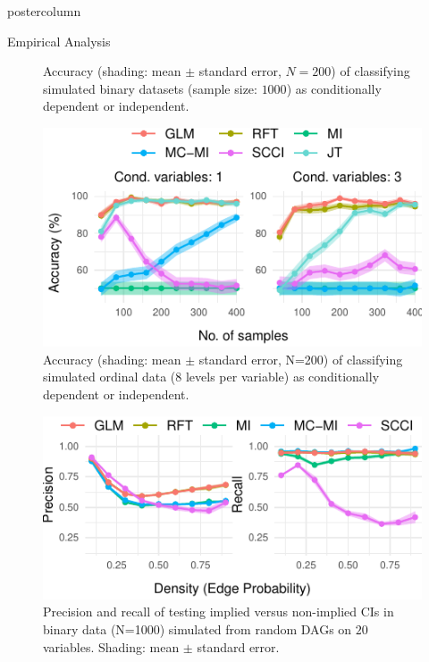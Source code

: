 \documentclass{beamer}
\begin{document}
\begin{frame}
\begin{columns}
\begin{column}{.33\textwidth}
\begin{beamercolorbox}[center]{postercolumn}
\begin{minipage}{.98\textwidth}
{\begin{myblock}{Empirical Analysis}
\begin{figure}
							\caption{Accuracy (shading: mean $\pm$ standard error, $N=200$) of classifying
							simulated binary datasets (sample size: $1000$) as conditionally
							dependent or independent.}
							\label{fig:cat_discrimination}
						\end{figure}
						\begin{figure}
							\centering
							\includegraphics[scale=3]{../in_person/imgs/accuracy_ordinal.pdf}
							\caption{Accuracy (shading: mean $\pm$ standard error, N=200) of
								classifying simulated ordinal data (8 levels per variable) as
								conditionally dependent or independent.}
							\label{fig:accuracy_ord}
						\end{figure}
						\begin{figure}
							\centering
							\includegraphics[scale=3]{../in_person/imgs/model_testing.pdf}
							\caption{Precision and recall of testing implied versus non-implied CIs
								 in binary data (N=1000) simulated from random DAGs on $ 20 $ variables.
								 Shading: mean $\pm$ standard error.} 
							\label{fig:model_testing}
						\end{figure}
					\end{myblock}
		}\end{minipage}\end{beamercolorbox}

\end{column}
\end{columns}
\end{frame}
\end{document}
